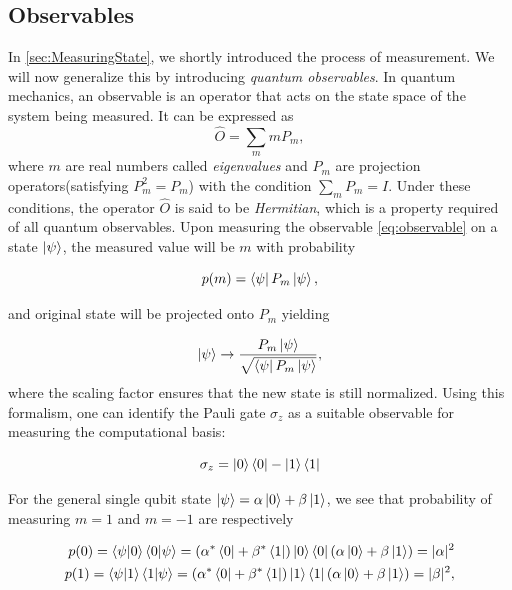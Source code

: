 \subsection{Observables}\label{sec:Observables}
In \autoref{sec:MeasuringState}, we shortly introduced the process of measurement. We will now generalize this by introducing \emph{quantum observables}. In quantum mechanics, an observable is an operator that acts on the state space of the system being measured. It can be expressed as
\begin{equation}\label{eq:observable}
    \hat{O} = \sum_m m P_m,
\end{equation}
where $m$ are real numbers called \emph{eigenvalues} and $P_m$ are projection operators(satisfying $P_m^2 = P_m$) with the condition $\sum_m P_m = I$. Under these conditions, the operator $\hat{O}$ is said to be \emph{Hermitian}, which is a property required of all quantum observables. Upon measuring the observable \autoref{eq:observable} on a state $\ket{\psi}$, the measured value will be $m$ with probability 

\begin{equation}
    p(m) = \bra{\psi}P_m\ket{\psi},
\end{equation}

and original state will be projected onto $P_m$ yielding 

\begin{equation}
    \ket{\psi} \rightarrow \frac{P_m\ket{\psi}}{\sqrt{\bra{\psi}P_m\ket{\psi}}},
\end{equation}
where the scaling factor ensures that the new state is still normalized. Using this formalism, one can identify the Pauli gate $\sigma_z$ as a suitable observable for measuring the computational basis:

\begin{equation}
    \sigma_z = \ket{0}\bra{0} - \ket{1}\bra{1}
\end{equation}

For the general single qubit state $\ket{\psi} = \alpha \ket{0} + \beta \ket{1}$, we see that probability of measuring $m=1$ and $m=-1$ are respectively

\begin{equation}
\begin{aligned}
    p(0) = \bra{\psi} \ket{0}\bra{0} \ket{\psi} = (\alpha^* \bra{0} + \beta^* \bra{1}) \ket{0}\bra{0} (\alpha \ket{0} + \beta \ket{1}) = |\alpha|^2\\
    p(1) = \bra{\psi} \ket{1}\bra{1} \ket{\psi} = (\alpha^* \bra{0} + \beta^* \bra{1}) \ket{1}\bra{1} (\alpha \ket{0} + \beta \ket{1}) = |\beta|^2,
\end{aligned}
\end{equation}

